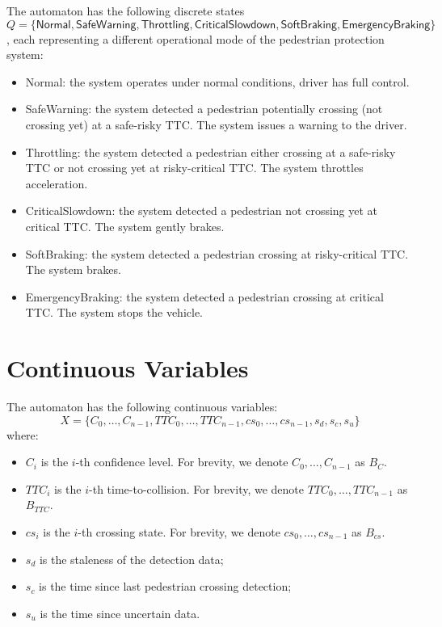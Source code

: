 \documentclass[12pt]{article}
\theoremstyle{definition}
\begin{document}
The automaton has the following discrete states 
\[Q = \{\mathsf{Normal}, \mathsf{SafeWarning}, \mathsf{Throttling}, \mathsf{CriticalSlowdown}, \mathsf{SoftBraking}, \mathsf{EmergencyBraking} \}\],
each representing a different operational mode of the pedestrian protection system:
\begin{itemize}
    \item Normal: the system operates under normal conditions, driver has full control.
    \item SafeWarning: the system detected a pedestrian potentially crossing (not crossing yet) at a safe-risky TTC. The system issues a warning to the driver.
    \item Throttling: the system detected a pedestrian either crossing at a safe-risky TTC or not crossing yet at risky-critical TTC. The system throttles acceleration.
    \item CriticalSlowdown: the system detected a pedestrian not crossing yet at critical TTC. The system gently brakes.
    \item SoftBraking: the system detected a pedestrian crossing at risky-critical TTC. The system brakes.
    \item EmergencyBraking: the system detected a pedestrian crossing at critical TTC. The system stops the vehicle.
\end{itemize}

\section{Continuous Variables}

The automaton has the following continuous variables:
\[X = \{C_0, \ldots, C_{n-1}, TTC_0, \ldots, TTC_{n-1}, cs_0, \ldots, cs_{n-1}, s_d, s_c, s_u\}\]
where:
\begin{itemize}
    \item $C_i$ is the $i$-th confidence level. For brevity, we denote $C_0, \ldots, C_{n-1}$ as $B_C$.
    \item $TTC_i$ is the $i$-th time-to-collision. For brevity, we denote $TTC_0, \ldots, TTC_{n-1}$ as $B_{TTC}$.
    \item $cs_i$ is the $i$-th crossing state. For brevity, we denote $cs_0, \ldots, cs_{n-1}$ as $B_{cs}$.
    \item $s_d$ is the staleness of the detection data;
    \item $s_c$ is the time since last pedestrian crossing detection;
    \item $s_u$ is the time since uncertain data.
\end{itemize}
\end{document}

